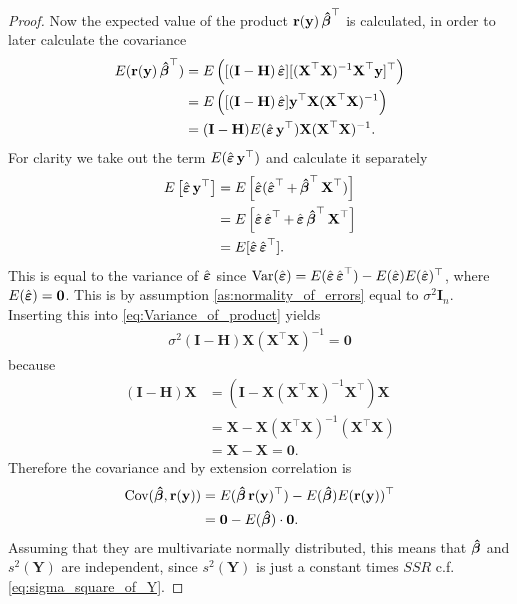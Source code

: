 \begin{proof}
Now the expected value of the product $\textbf{r}(\textbf{y}) \operatorname{\boldsymbol{\hat{\beta}}}^\top$ is calculated, in order to later calculate the covariance
\begin{align} \label{eq:Variance_of_product}
    E(\textbf{r}(\textbf{y}) \operatorname{\boldsymbol{\hat{\beta}}}^\top) &= E \left( [(\textbf{I} - \textbf{H}) \operatorname{\hat{\boldsymbol{\varepsilon}}}] [(\textbf{X}^\top \textbf{X})^{-1} \textbf{X}^\top \textbf{y}]^\top \right) \nonumber \\
    &= E \left( [(\textbf{I}-\textbf{H}) \operatorname{\hat{\boldsymbol{\varepsilon}}}] \textbf{y}^\top \textbf{X} (\textbf{X}^\top \textbf{X})^{-1} \right) \nonumber \\
    &= (\textbf{I}-\textbf{H}) E(\operatorname{\hat{\boldsymbol{\varepsilon}}} \textbf{y}^\top ) \textbf{X}(\textbf{X}^\top \textbf{X})^{-1}. 
\end{align}
For clarity we take out the term $E(\operatorname{\hat{\boldsymbol{\varepsilon}}} \textbf{y}^\top )$ and calculate it separately
\begin{align*}
    E \left[ \operatorname{\hat{\boldsymbol{\varepsilon}}} \textbf{y}^\top \right] &= E \left[ \operatorname{\hat{\boldsymbol{\varepsilon}}} (\operatorname{\hat{\boldsymbol{\varepsilon}}}^\top + \operatorname{\boldsymbol{\hat{\beta}}}^\top \textbf{X}^\top) \right] \\
    &= E \left[ \operatorname{\hat{\boldsymbol{\varepsilon}}} \operatorname{\hat{\boldsymbol{\varepsilon}}}^\top + \operatorname{\hat{\boldsymbol{\varepsilon}}} \operatorname{\boldsymbol{\hat{\beta}}}^\top \textbf{X}^\top \right] \\
    &= E[\operatorname{\hat{\boldsymbol{\varepsilon}}} \operatorname{\hat{\boldsymbol{\varepsilon}}}^\top].
\end{align*}
This is equal to the variance of $\operatorname{\hat{\boldsymbol{\varepsilon}}}$ since $\operatorname{\text{Var}}(\operatorname{\hat{\boldsymbol{\varepsilon}}}) = E(\operatorname{\hat{\boldsymbol{\varepsilon}}} \operatorname{\hat{\boldsymbol{\varepsilon}}}^\top) - E(\operatorname{\hat{\boldsymbol{\varepsilon}}})E(\operatorname{\hat{\boldsymbol{\varepsilon}}})^\top$, where $E(\operatorname{\hat{\boldsymbol{\varepsilon}}})=\textbf{0}$.
This is by assumption \ref{as:normality_of_errors} equal to $\sigma^2 \textbf{I}_n$.
Inserting this into \eqref{eq:Variance_of_product} yields
\begin{align*}
    \sigma^2 (\textbf{I}-\textbf{H}) \textbf{X} (\textbf{X}^\top \textbf{X})^{-1} = \textbf{0}
\end{align*}
because
\begin{align*}
    (\textbf{I}-\textbf{H})\textbf{X} &= (\textbf{I}-\textbf{X}(\textbf{X}^\top \textbf{X})^{-1}\textbf{X}^\top)\textbf{X} \\
    &= \textbf{X} - \textbf{X} (\textbf{X}^\top \textbf{X})^{-1} (\textbf{X}^\top \textbf{X}) \\
    &= \textbf{X} - \textbf{X} = \textbf{0}.
\end{align*}
Therefore the covariance and by extension correlation is
\begin{align*}
    \operatorname{\text{Cov}} (\operatorname{\boldsymbol{\hat{\beta}}}, \textbf{r}(\textbf{y})) &= E(\operatorname{\boldsymbol{\hat{\beta}}}\textbf{r}(\textbf{y})^\top) - E(\operatorname{\boldsymbol{\hat{\beta}}}) E(\textbf{r}(\textbf{y}))^\top \\
    &= \textbf{0} - E(\operatorname{\boldsymbol{\hat{\beta}}}) \cdot \textbf{0}.
\end{align*}
Assuming that they are multivariate normally distributed, this means that $\operatorname{\boldsymbol{\hat{\beta}}}$ and $s^2(\textbf{Y})$ are independent, since $s^2(\textbf{Y})$ is just a constant times $SSR$ c.f.$\!$ \eqref{eq:sigma_square_of_Y}.


\end{proof}
